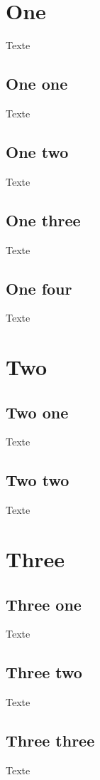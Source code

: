 \documentclass{article}
\begin{document}

\section{One}

Texte

\subsection{One one}

Texte

\clearpage

\subsection{One two}

Texte

\clearpage

\subsection{One three}

Texte

\subsection{One four}

Texte

\clearpage

\section{Two}

\subsection{Two one}

Texte
\clearpage

\subsection{Two two}

Texte

\clearpage

\section{Three}

\subsection{Three one}

Texte

\subsection{Three two}

Texte

\clearpage
\subsection{Three three}

Texte
\end{document}
